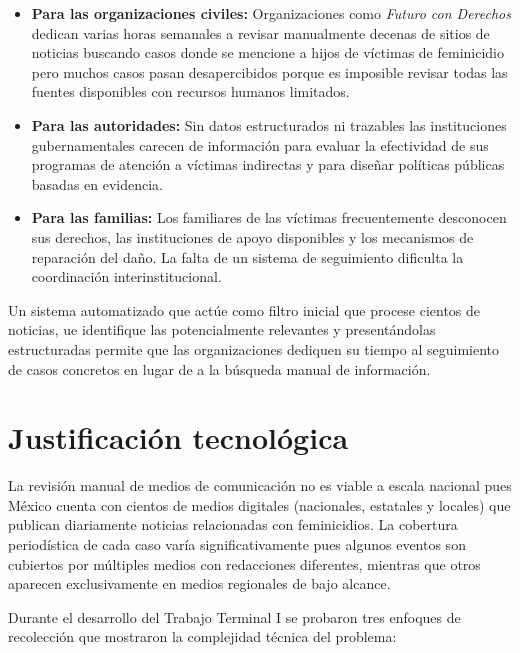 \begin{itemize}
    \item \textbf{Para las organizaciones civiles:} Organizaciones como \textit{Futuro con Derechos} dedican varias horas
    semanales a revisar manualmente decenas de sitios de noticias buscando casos donde se mencione a hijos de víctimas de
    feminicidio pero muchos casos pasan desapercibidos porque es imposible revisar todas las fuentes disponibles con
    recursos humanos limitados.
    
    \item \textbf{Para las autoridades:} Sin datos estructurados ni trazables las instituciones gubernamentales carecen de
    información para evaluar la efectividad de sus programas de atención a víctimas indirectas y para diseñar políticas
    públicas basadas en evidencia.
    
    \item \textbf{Para las familias:} Los familiares de las víctimas frecuentemente desconocen sus derechos, las instituciones
    de apoyo disponibles y los mecanismos de reparación del daño. La falta de un sistema de seguimiento dificulta la coordinación
    interinstitucional.
\end{itemize}

Un sistema automatizado que actúe como filtro inicial que procese cientos de noticias, ue identifique las potencialmente relevantes
y presentándolas estructuradas permite que las organizaciones dediquen su tiempo al seguimiento de casos concretos en lugar de a
la búsqueda manual de información.

\section{Justificación tecnológica}
\label{sec:justificacionTecnologica}

La revisión manual de medios de comunicación no es viable a escala nacional pues México cuenta con cientos de medios
digitales (nacionales, estatales y locales) que publican diariamente noticias relacionadas con feminicidios. La cobertura
periodística de cada caso varía significativamente pues algunos eventos son cubiertos por múltiples medios con redacciones
diferentes, mientras que otros aparecen exclusivamente en medios regionales de bajo alcance.

Durante el desarrollo del Trabajo Terminal I se probaron tres enfoques de recolección que mostraron la complejidad técnica del problema:

